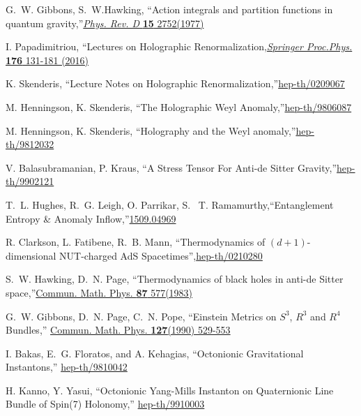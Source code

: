 \documentclass[12pt, a4paper]{article}
\numberwithin{equation}{section}
\begin{document}
\begin{thebibliography}{10}
G.~W. Gibbons, S.~W.Hawking, ``{Action integrals and partition functions in quantum gravity},''\href{https://journals.aps.org/prd/abstract/10.1103/PhysRevD.15.2752}{\textit{Phys. Rev. D} \textbf{15} 2752(1977)}

I. Papadimitriou, ``{Lectures on Holographic Renormalization},\href{http://indico.ictp.it/event/8560/session/31/contribution/130/material/0/1.pdf}{\textit{Springer Proc.Phys.} \textbf{176} 131-181 (2016)}

K. Skenderis, ``{Lecture Notes on Holographic Renormalization},''\href{https://arxiv.org/abs/hep-th/0209067}{hep-th/0209067}

M. Henningson, K. Skenderis, ``{The Holographic Weyl Anomaly},''\href{https://arxiv.org/pdf/hep-th/9806087.pdf}{hep-th/9806087}

M. Henningson, K. Skenderis, ``{Holography and the Weyl anomaly},''\href{https://arxiv.org/pdf/hep-th/9812032.pdf}{hep-th/9812032}

V. Balasubramanian, P. Kraus, ``{A Stress Tensor For Anti-de Sitter Gravity},''\href{https://arxiv.org/pdf/hep-th/9902121.pdf}{hep-th/9902121}

T.~L. Hughes, R.~G. Leigh, O. Parrikar, S. ~T. Ramamurthy,``{Entanglement Entropy \& Anomaly Inflow},''\href{https://arxiv.org/pdf/1509.04969.pdf}{1509.04969}

R. Clarkson, L. Fatibene, R.~B. Mann, ``{Thermodynamics of $(d+1)$-dimensional NUT-charged AdS Spacetimes}'',\href{https://arxiv.org/abs/hep-th/0210280v2}{hep-th/0210280}

S.~W. Hawking, D.~N. Page, ``{Thermodynamics of black holes in anti-de Sitter space},''\href{https://link.springer.com/article/10.1007/BF01208266}{Commun. Math. Phys. \textbf{87} 577(1983)}

G.~W. Gibbons, D.~N. Page, C.~N. Pope, ``{Einstein Metrics on $S^3$, $R^3$ and $R^4$ Bundles},'' \href{https://projecteuclid.org/download/pdf_1/euclid.cmp/1104180218}{Commun. Math. Phys. \textbf{127}(1990) 529-553}

I. Bakas, E.~G. Floratos, and A. Kehagias, ``{Octonionic Gravitational Instantons},'' \href{https://arxiv.org/pdf/hep-th/9810042.pdf}{hep-th/9810042}

	H. Kanno, Y. Yasui, ``{Octonionic Yang-Mills Instanton on Quaternionic Line Bundle of Spin(7) Holonomy},'' \href{https://arxiv.org/pdf/hep-th/9910003.pdf}{hep-th/9910003}
	

\end{thebibliography}
\end{document}
